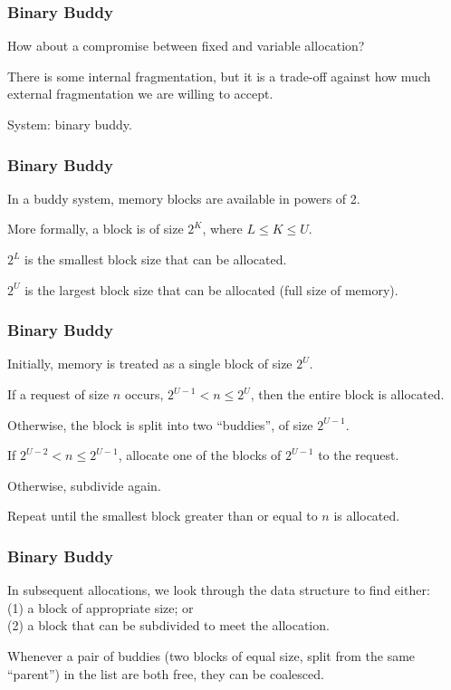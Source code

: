 \begin{frame}
\frametitle{Binary Buddy}
How about a compromise between fixed and variable allocation?

There is some internal fragmentation, but it is a trade-off against how much external fragmentation we are willing to accept.

System: \alert{binary buddy}.


\end{frame}



\begin{frame}
\frametitle{Binary Buddy}

In a buddy system, memory blocks are available in powers of 2. 

More formally, a block is of size $2^{K}$, where $L \leq K \leq U$.

$2^{L}$ is the smallest block size that can be allocated.

$2^{U}$ is the largest block size that can be allocated (full size of memory). 

\end{frame}



\begin{frame}
\frametitle{Binary Buddy}

Initially, memory is treated as a single block of size $2^{U}$. 

If a request of size $n$ occurs, $2^{U-1} < n \leq 2^{U}$, then the entire block is allocated. 

Otherwise, the block is split into two ``buddies'', of size $2^{U-1}$. 

If $2^{U-2} < n \leq 2^{U-1}$, allocate one of the blocks of $2^{U-1}$ to the request.

Otherwise, subdivide again. 
 
Repeat until the smallest block greater than or equal to $n$ is allocated. 

\end{frame}

\begin{frame}
\frametitle{Binary Buddy}

In subsequent allocations, we look through the data structure to find either:\\
\quad (1) a block of appropriate size; or\\
\quad (2) a block that can be subdivided to meet the allocation. 

Whenever a pair of buddies (two blocks of equal size, split from the same ``parent'') in the list are both free, they can be coalesced.

\end{frame}



